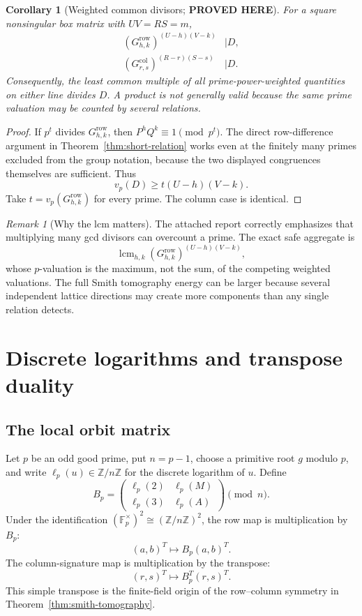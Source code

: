 \documentclass[11pt]{article}
\newtheorem{corollary}[theorem]{Corollary}
\theoremstyle{definition}
\theoremstyle{remark}
\newtheorem{remark}[theorem]{Remark}
\newcommand{\Z}{\mathbb Z}
\newcommand{\F}{\mathbb F}
\newcommand{\vp}{v_p}
\newcommand{\lcm}{\operatorname{lcm}}
\newcommand{\statusproved}{\textcolor{statusgreen}{\textbf{PROVED HERE}}}
\begin{document}
\begin{corollary}[Weighted common divisors; \statusproved]\label{cor:weighted-gcd}
For a square nonsingular box matrix with $UV=RS=m$,
\begin{align}
\left(G^{\mathrm{row}}_{h,k}\right)^{(U-h)(V-k)}&\mid D,\label{eq:row-weighted-divisor}\\
\left(G^{\mathrm{col}}_{r,s}\right)^{(R-r)(S-s)}&\mid D.\label{eq:col-weighted-divisor}
\end{align}
Consequently, the least common multiple of all prime-power-weighted quantities on either line divides $D$.  A product is not generally valid because the same prime valuation may be counted by several relations.
\end{corollary}

\begin{proof}
If $p^t$ divides $G^{\mathrm{row}}_{h,k}$, then $P^hQ^k\equiv1\pmod{p^t}$.  The direct row-difference argument in Theorem~\ref{thm:short-relation} works even at the finitely many primes excluded from the group notation, because the two displayed congruences themselves are sufficient.  Thus
\[
\vp(D)\ge t(U-h)(V-k).
\]
Take $t=\vp(G^{\mathrm{row}}_{h,k})$ for every prime.  The column case is identical.
\end{proof}

\begin{remark}[Why the lcm matters]
The attached report correctly emphasizes that multiplying many gcd divisors can overcount a prime.  The exact safe aggregate is
\[
\lcm_{h,k}
\left(G^{\mathrm{row}}_{h,k}\right)^{(U-h)(V-k)},
\]
whose $p$-valuation is the maximum, not the sum, of the competing weighted valuations.  The full Smith tomography energy can be larger because several independent lattice directions may create more components than any single relation detects.
\end{remark}

\section{Discrete logarithms and transpose duality}

\subsection{The local orbit matrix}

Let $p$ be an odd good prime, put $n=p-1$, choose a primitive root $g$ modulo $p$, and write $\ell_p(u)\in\Z/n\Z$ for the discrete logarithm of $u$.  Define
\begin{equation}\label{eq:Bp}
B_p=
\begin{pmatrix}
\ell_p(2)&\ell_p(M)\\
\ell_p(3)&\ell_p(A)
\end{pmatrix}\pmod n.
\end{equation}
Under the identification $(\F_p^\times)^2\cong(\Z/n\Z)^2$, the row map is multiplication by $B_p$:
\[
(a,b)^T\longmapsto B_p(a,b)^T.
\]
The column-signature map is multiplication by the transpose:
\[
(r,s)^T\longmapsto B_p^T(r,s)^T.
\]
This simple transpose is the finite-field origin of the row--column symmetry in Theorem~\ref{thm:smith-tomography}.
\end{document}
